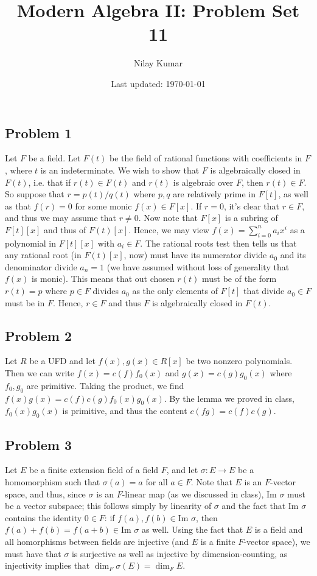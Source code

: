 \documentclass{../../mathnotes}
\title{Modern Algebra II: Problem Set 11}
\author{Nilay Kumar}
\date{Last updated: \today}
\begin{document}
\maketitle

\subsection*{Problem 1}

Let $F$ be a field. Let $F(t)$ be the field of rational functions with coefficients in $F$, where $t$
is an indeterminate. We wish to show that $F$ is algebraically closed in $F(t)$, i.e. that if $r(t)\in F(t)$
and $r(t)$ is algebraic over $F$, then $r(t)\in F$. So suppose that $r=p(t)/q(t)$ where $p,q$ are relatively prime
in $F[t]$, as well as that $f(r)=0$ for some monic $f(x)\in F[x]$. If $r=0$, it's clear that $r\in F$, and thus
we may assume that $r\neq 0$. Now note that $F[x]$ is a subring of $F[t][x]$ and thus of $F(t)[x]$. Hence, we may
view $f(x)=\sum_{i=0}^n a_ix^i$ as a polynomial in $F[t][x]$ with $a_i\in F$. The rational roots test then tells us that
any rational root (in $F(t)[x]$, now) must have its numerator divide $a_0$ and its denominator divide $a_n=1$ (we
have assumed without loss of generality that $f(x)$ is monic). This means that out chosen $r(t)$ must be of the form
$r(t)=p$ where $p\in F$ divides $a_0$ as the only elements of $F[t]$ that divide $a_0\in F$ must be in $F$.
Hence, $r\in F$ and thus $F$ is algebraically closed in $F(t)$.

\subsection*{Problem 2}


Let $R$ be a UFD and let $f(x),g(x)\in R[x]$ be two nonzero polynomials.
Then we can write $f(x)=c(f)f_0(x)$ and $g(x)=c(g)g_0(x)$ where $f_0,g_0$ are primitive.
Taking the product, we find $f(x)g(x)=c(f)c(g)f_0(x)g_0(x)$. By the lemma we proved in class,
$f_0(x)g_0(x)$ is primitive, and thus the content $c(fg)=c(f)c(g)$.

\subsection*{Problem 3}

Let $E$ be a finite extension field of a field $F$, and let $\sigma:E\to E$ be a homomorphism such that $\sigma(a)=a$
for all $a\in F$. Note that $E$ is an $F$-vector space, and thus, since $\sigma$ is an $F$-linear map (as we discussed in class),
$\text{Im } \sigma$ must be a vector subspace; this follows simply by linearity of $\sigma$ and the fact that $\text{Im }\sigma$ contains
the identity $0\in F$: if $f(a),f(b)\in\text{Im }\sigma$, then $f(a)+f(b)=f(a+b)\in\text{Im }\sigma$ as well. Using the fact that
$E$ is a field and all homorphisms between fields are injective (and $E$ is a finite $F$-vector space), we must have that 
$\sigma$ is surjective as well as injective by dimension-counting, as injectivity implies that $\dim_F\sigma(E)=\dim_F E$.
\end{document}
